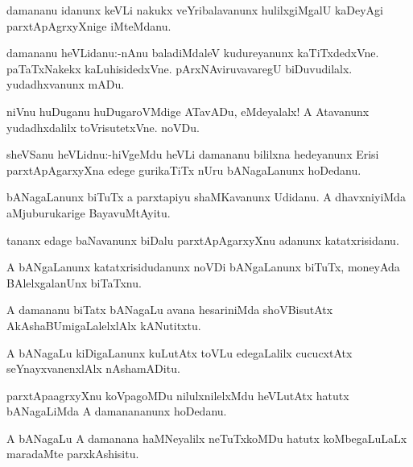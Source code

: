 \documentclass{article}
\begin{document}
\begin{mn}%
damananu idanunx keVLi nakukx veYribalavanunx hulilxgiMgalU kaDeyAgi parxtApAgrxyXnige 
iMteMdanu.
\end{mn}

\begin{mn}%
damananu heVLidanu:-nAnu baladiMdaleV kudureyanunx kaTiTxdedxVne. paTaTxNakekx 
kaLuhisidedxVne. pArxNAviruvavaregU biDuvudilalx. yudadhxvanunx mADu.
\end{mn}

\begin{mn}%
niVnu huDuganu huDugaroVMdige ATavADu, eMdeyalalx! A Atavanunx yudadhxdalilx 
toVrisutetxVne. noVDu.
\end{mn}

\begin{mn}%
sheVSanu heVLidnu:-hiVgeMdu heVLi damananu bililxna hedeyanunx Erisi parxtApAgarxyXna edege
gurikaTiTx nUru bANagaLanunx hoDedanu.
\end{mn}

\begin{mn}%
bANagaLanunx biTuTx a parxtapiyu shaMKavanunx Udidanu. A dhavxniyiMda aMjuburukarige 
BayavuMtAyitu.
\end{mn}

\begin{mn}%
tananx edage baNavanunx biDalu parxtApAgarxyXnu adanunx katatxrisidanu.
\end{mn}

\begin{mn}%
A bANgaLanunx katatxrisidudanunx noVDi bANgaLanunx biTuTx, moneyAda BAlelxgalanUnx biTaTxnu.
\end{mn}

\begin{mn}%
A damananu biTatx bANagaLu avana hesariniMda shoVBisutAtx AkAshaBUmigaLalelxlAlx 
kANutitxtu.
\end{mn}

\begin{mn}%
A bANagaLu kiDigaLanunx kuLutAtx toVLu edegaLalilx cucucxtAtx seYnayxvanenxlAlx nAshamADitu.
\end{mn}

\begin{mn}%
parxtApaagrxyXnu koVpagoMDu nilulxnilelxMdu heVLutAtx hatutx bANagaLiMda A damanananunx 
hoDedanu.
\end{mn}

\begin{mn}%
A bANagaLu A damanana haMNeyalilx neTuTxkoMDu hatutx koMbegaLuLaLx maradaMte parxkAshisitu.
\end{mn}
\end{document}
